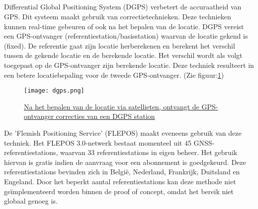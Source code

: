 \subsection{}
Differential Global Positioning System (DGPS) verbetert de accuraatheid van GPS. Dit systeem maakt gebruik van correctietechnieken. Deze technieken kunnen real-time gebeuren of ook na het bepalen van de locatie. DGPS vereist een GPS-ontvanger (referentiestation/basisstation) waarvan de locatie gekend is (fixed). De referentie gaat zijn locatie herberekenen en berekent het verschil tussen de gekende locatie en de berekende locatie. Het verschil wordt als volgt toegepast op de GPS-ontvanger zijn berekende locatie. Deze techniek resulteert in een betere locatiebepaling voor de tweede GPS-ontvanger. \autocite{dgps} (Zie figuur:\ref{fig:dgps})
\begin{figure}
	\texttt{[image: dgps.png]}
	\caption[Differential Global Positioning System]{\href{https://www.researchgate.net/figure/Components-of-a-DGPS-System_fig1_252064818}{Na het bepalen van de locatie via satellieten, ontvangt de GPS-ontvanger correcties van een DGPS station \autocite{fig_dgps}}}
	\label{fig:dgps}
\end{figure}
\newline
De 'Flemish Positioning Service' (FLEPOS) maakt eveneens gebruik van deze techniek. Het FLEPOS 3.0-netwerk bestaat momenteel uit 45 GNSS-referentiestations, waarvan 33 referentiestations in eigen beheer. Het gebruik hiervan is gratis indien de aanvraag voor een abonnement is goedgekeurd. Deze referentiestations bevinden zich in België, Nederland, Frankrijk, Duitsland en Engeland.
\newline
Door het beperkt aantal referentiestations kan deze methode niet geïmplementeerd worden binnen de proof of concept, omdat het bereik niet globaal genoeg is.
